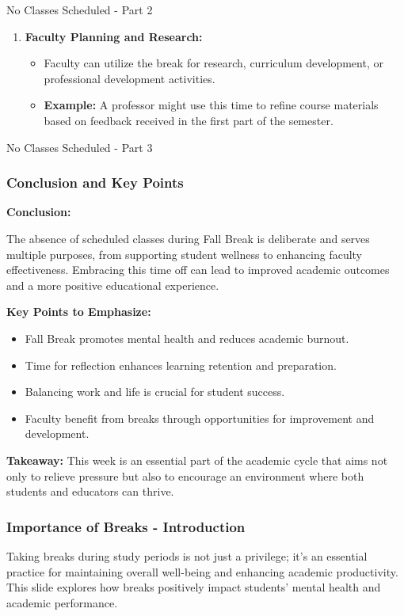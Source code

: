 \documentclass[aspectratio=169]{beamer}
\begin{document}
\begin{frame}[fragile]{No Classes Scheduled - Part 2}
\begin{enumerate}
        \item \textbf{Faculty Planning and Research:}
        \begin{itemize}
            \item Faculty can utilize the break for research, curriculum development, or professional development activities.
            \item \textbf{Example:} A professor might use this time to refine course materials based on feedback received in the first part of the semester.
        \end{itemize}
    \end{enumerate}
\end{frame}

\begin{frame}[fragile]{No Classes Scheduled - Part 3}
    \frametitle{Conclusion and Key Points}
    
    \textbf{Conclusion:}
    
    The absence of scheduled classes during Fall Break is deliberate and serves multiple purposes, from supporting student wellness to enhancing faculty effectiveness. Embracing this time off can lead to improved academic outcomes and a more positive educational experience.
    
    \textbf{Key Points to Emphasize:}
    \begin{itemize}
        \item Fall Break promotes mental health and reduces academic burnout.
        \item Time for reflection enhances learning retention and preparation.
        \item Balancing work and life is crucial for student success.
        \item Faculty benefit from breaks through opportunities for improvement and development.
    \end{itemize}

    \textbf{Takeaway:} This week is an essential part of the academic cycle that aims not only to relieve pressure but also to encourage an environment where both students and educators can thrive.
\end{frame}

\begin{frame}[fragile]
    \frametitle{Importance of Breaks - Introduction}
    Taking breaks during study periods is not just a privilege; it's an essential practice for maintaining overall well-being and enhancing academic productivity. This slide explores how breaks positively impact students' mental health and academic performance.
\end{frame}
\end{document}
